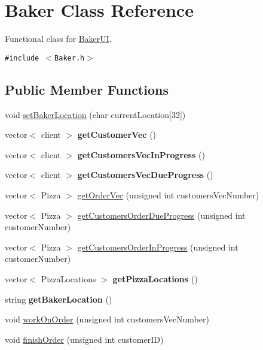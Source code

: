 \hypertarget{class_baker}{
\section{Baker Class Reference}
\label{class_baker}
}
Functional class for \hyperlink{class_baker_u_i}{Baker\-UI}.  


{\tt \#include $<$Baker.h$>$}

\subsection*{Public Member Functions}
\begin{CompactItemize}
\item 
void \hyperlink{class_baker_b85151ecb20282d81b4dab489fea7dd8}{set\-Baker\-Location} (char current\-Location\mbox{[}32\mbox{]})
\item 
\hypertarget{class_baker_3970b0afe27b514282442b11592e1602}{
vector$<$ client $>$ {\bf get\-Customer\-Vec} ()}
\label{class_baker_3970b0afe27b514282442b11592e1602}

\item 
\hypertarget{class_baker_8b798f098bfd9a23b11fa1d63d089609}{
vector$<$ client $>$ {\bf get\-Customers\-Vec\-In\-Progress} ()}
\label{class_baker_8b798f098bfd9a23b11fa1d63d089609}

\item 
\hypertarget{class_baker_4c05936fa38e14b768511921a3288c57}{
vector$<$ client $>$ {\bf get\-Customers\-Vec\-Due\-Progress} ()}
\label{class_baker_4c05936fa38e14b768511921a3288c57}

\item 
vector$<$ Pizza $>$ \hyperlink{class_baker_ad0cbeddec394b25c5eade57247f4110}{get\-Order\-Vec} (unsigned int customers\-Vec\-Number)
\item 
vector$<$ Pizza $>$ \hyperlink{class_baker_7c9256e53372bd3a698e40cf64003c50}{get\-Customers\-Order\-Due\-Progress} (unsigned int customer\-Number)
\item 
vector$<$ Pizza $>$ \hyperlink{class_baker_96a7c1ec2dc23919a4e7ca8c399476e1}{get\-Customers\-Order\-In\-Progress} (unsigned int customer\-Number)
\item 
\hypertarget{class_baker_3d38e7498fba59674c7d3838bf4c1824}{
vector$<$ Pizza\-Locations $>$ {\bf get\-Pizza\-Locations} ()}
\label{class_baker_3d38e7498fba59674c7d3838bf4c1824}

\item 
\hypertarget{class_baker_363b0d0c242923ca3a76ebd4e608cc2d}{
string {\bf get\-Baker\-Location} ()}
\label{class_baker_363b0d0c242923ca3a76ebd4e608cc2d}

\item 
void \hyperlink{class_baker_9616413c80f3814907a9c2399ac50438}{work\-On\-Order} (unsigned int customers\-Vec\-Number)
\item 
void \hyperlink{class_baker_222a16bf113b70cbe0388a7291978a57}{finish\-Order} (unsigned int customer\-ID)
\end{CompactItemize}
